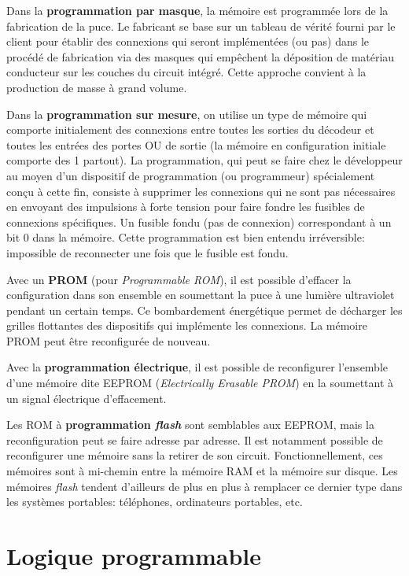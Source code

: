 \documentclass[11pt]{article}
\begin{document}
Dans la \textbf{programmation par masque}, la mémoire est programmée lors de
la fabrication de la puce. Le fabricant se base sur un tableau de
vérité fourni par le client pour établir des connexions qui seront
implémentées (ou pas) dans le procédé de fabrication via des masques
qui empêchent la déposition de matériau conducteur sur les couches du
circuit intégré.  Cette approche convient à la production de masse à
grand volume.

Dans la \textbf{programmation sur mesure}, on utilise un type de mémoire qui
comporte initialement des connexions entre toutes les sorties du
décodeur et toutes les entrées des portes OU de sortie (la mémoire en
configuration initiale comporte des 1 partout). La programmation, qui
peut se faire chez le développeur au moyen d'un dispositif de
programmation (ou programmeur) spécialement conçu à cette fin,
consiste à supprimer les connexions qui ne sont pas nécessaires en
envoyant des impulsions à forte tension pour faire fondre les fusibles
de connexions spécifiques. Un fusible fondu (pas de connexion)
correspondant à un bit 0 dans la mémoire. Cette programmation est
bien entendu irréversible: impossible de reconnecter une fois que le
fusible est fondu.

Avec un \textbf{PROM} (pour \emph{Programmable ROM}), il est possible d'effacer la
configuration dans son ensemble en soumettant la puce à une lumière
ultraviolet pendant un certain temps. Ce bombardement énergétique
permet de décharger les grilles flottantes des dispositifs qui
implémente les connexions. La mémoire PROM peut être reconfigurée de
nouveau.

Avec la \textbf{programmation électrique}, il est possible de reconfigurer
l'ensemble d'une mémoire dite EEPROM (\emph{Electrically Erasable PROM})
en la soumettant à un signal électrique d'effacement. 

Les ROM à \textbf{programmation \emph{flash}} sont semblables aux EEPROM, mais la
reconfiguration peut se faire adresse par adresse.  Il est notamment
possible de reconfigurer une mémoire sans la retirer de son circuit.
Fonctionnellement, ces mémoires sont à mi-chemin entre la mémoire RAM
et la mémoire sur disque. Les mémoires \emph{flash} tendent d'ailleurs de
plus en plus à remplacer ce dernier type dans les systèmes portables:
téléphones, ordinateurs portables, etc.

\section{Logique programmable}
\label{sec:org8d95ea7}
\end{document}
